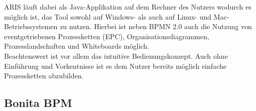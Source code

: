 \begin{figure}[H]
\begin{minipage}{\linewidth}
\begin{center}
\end{center}
\end{minipage}
\end{figure}


ARIS läuft dabei als Java-Applikation
auf dem Rechner des Nutzers wodurch es möglich ist, das Tool sowohl auf Windows-
als auch auf Linux- und Mac-Betriebssystemen zu nutzen.
Hierbei ist neben BPMN 2.0 auch die Nutzung von eventgetriebenen
Prozessketten (EPC), Organisationsdiagrammen, 
Prozesslandschaften und Whiteboards möglich.\\

Beachtenswert ist vor allem das intuitive Bedienungskonzept.
Auch ohne Einführung und Vorkentnisse ist es dem Nutzer bereits möglich einfache
Prozessketten abzubilden.


\subsection{Bonita BPM}

